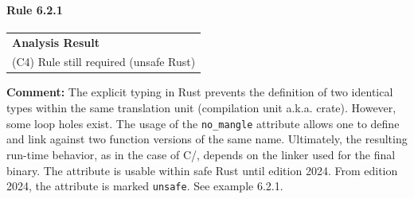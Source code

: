 \paragraph{Rule 6.2.1}
\begin{longtable}{p{13cm}}
\textbf{Analysis Result} \\
(C4) Rule still required (unsafe Rust) \\
\end{longtable}
\textbf{Comment:} The explicit typing in Rust prevents the definition of two identical types within the same translation unit (compilation unit a.k.a. crate). However, some loop holes exist. The usage of the \texttt{no\_mangle} attribute allows one to define and link against two function versions of the same name. Ultimately, the resulting run-time behavior, as in the case of C/\Cpp, depends on the linker used for the final binary. The attribute is usable within safe Rust until edition 2024. From edition 2024, the attribute is marked \texttt{unsafe}. See example 6.2.1. \\

